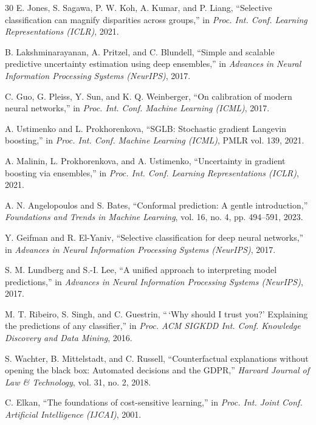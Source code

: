 \documentclass[conference]{IEEEtran}
\begin{document}
\begin{thebibliography}{30}
 E. Jones, S. Sagawa, P. W. Koh, A. Kumar, and P. Liang,
``Selective classification can magnify disparities across groups,'' in
\emph{Proc. Int. Conf. Learning Representations (ICLR)}, 2021.

 B. Lakshminarayanan, A. Pritzel, and C.
Blundell, ``Simple and scalable predictive uncertainty estimation using deep
ensembles,'' in \emph{Advances in Neural Information Processing Systems
(NeurIPS)}, 2017.

 C. Guo, G. Pleiss, Y. Sun, and K. Q. Weinberger, ``On
calibration of modern neural networks,'' in \emph{Proc. Int. Conf. Machine
Learning (ICML)}, 2017.

 A. Ustimenko and L. Prokhorenkova, ``SGLB:
Stochastic gradient Langevin boosting,'' in \emph{Proc. Int. Conf. Machine
Learning (ICML)}, PMLR vol. 139, 2021.

 A. Malinin, L. Prokhorenkova, and A. Ustimenko,
``Uncertainty in gradient boosting via ensembles,'' in \emph{Proc. Int.
Conf. Learning Representations (ICLR)}, 2021.

 A. N. Angelopoulos and S. Bates, ``Conformal
prediction: A gentle introduction,'' \emph{Foundations and Trends in Machine
Learning}, vol. 16, no. 4, pp. 494--591, 2023.

 Y. Geifman and R. El-Yaniv, ``Selective classification
for deep neural networks,'' in \emph{Advances in Neural Information
Processing Systems (NeurIPS)}, 2017.

 S. M. Lundberg and S.-I. Lee, ``A unified approach to
interpreting model predictions,'' in \emph{Advances in Neural Information
Processing Systems (NeurIPS)}, 2017.

 M. T. Ribeiro, S. Singh, and C. Guestrin, ``\,`Why
should I trust you?' Explaining the predictions of any classifier,'' in
\emph{Proc. ACM SIGKDD Int. Conf. Knowledge Discovery and Data Mining},
2016.

 S. Wachter, B. Mittelstadt, and C. Russell,
``Counterfactual explanations without opening the black box: Automated
decisions and the GDPR,'' \emph{Harvard Journal of Law \& Technology},
vol. 31, no. 2, 2018.

 C. Elkan, ``The foundations of cost-sensitive
learning,'' in \emph{Proc. Int. Joint Conf. Artificial Intelligence
(IJCAI)}, 2001.


\end{thebibliography}
\end{document}
